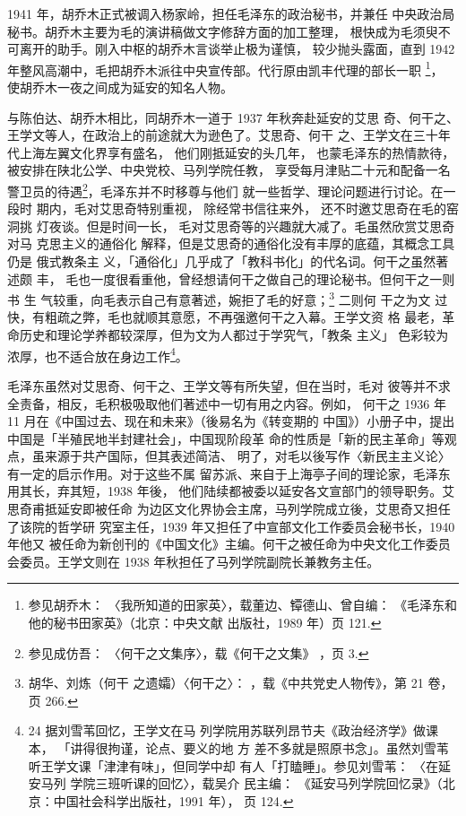 1941 年，胡乔木正式被调入杨家岭，担任毛泽东的政治秘书，并兼任 中央政治局
秘书。胡乔木主要为毛的演讲稿做文字修辞方面的加工整理， 根快成为毛须臾不
可离开的助手。刚入中枢的胡乔木言谈举止极为谨慎， 较少抛头露面，直到 1942
年整风高潮中，毛把胡乔木派往中央宣传部。代行原由凯丰代理的部长一职
\footnote{参见胡乔木： 〈我所知道的田家英〉，载董边、镡德山、曾自编：
《毛泽东和他的秘书田家英》（北京：中央文献 出版社，1989 年）页 121.}，
使胡乔木一夜之间成为延安的知名人物。

与陈伯达、胡乔木相比，同胡乔木一道于 1937 年秋奔赴延安的艾思 奇、何干之、
王学文等人，在政治上的前途就大为逊色了。艾思奇、何干 之、王学文在三十年
代上海左翼文化界享有盛名， 他们刚抵延安的头几年， 也蒙毛泽东的热情款待，
被安排在陕北公学、中央党校、马列学院任教， 享受每月津贴二十元和配备一名
警卫员的待遇\footnote{参见成仿吾： 〈何干之文集序〉，载《何干之文集》
，页 3.}，毛泽东并不时移尊与他们 就一些哲学、理论问题进行讨论。在一段时
期内，毛对艾思奇特别重视， 除经常书信往来外， 还不时邀艾思奇在毛的窑洞挑
灯夜谈。但是时间一长， 毛对艾思奇等的兴趣就大减了。毛虽然欣赏艾思奇对马
克思主义的通俗化 解释，但是艾思奇的通俗化没有丰厚的底蕴，其概念工具仍是
俄式教条主 义，「通俗化」几乎成了「教科书化」的代名词。何干之虽然著述颇
丰， 毛也一度很看重他，曾经想请何干之做自己的理论秘书。但何干之一则书 生
气较重，向毛表示自己有意著述，婉拒了毛的好意；\footnote{胡华、刘炼（何干
之遗孀）〈何干之〉： ，载《中共党史人物传》，第 21 卷，页 266.} 二则何
干之为文 过快，有粗疏之弊，毛也就顺其意愿，不再强邀何干之入幕。王学文资
格 最老，革命历史和理论学养都较深厚，但为文为人都过于学究气，「教条 主义」
色彩较为浓厚，也不适合放在身边工作\footnote{24 据刘雪苇回忆，王学文在马
列学院用苏联列昂节夫《政治经济学》做课本， 「讲得很拘谨，论点、要义的地
方 差不多就是照原书念」。虽然刘雪苇听王学文课「津津有味」，但同学中却
有人「打瞌睡」。参见刘雪苇： 〈在延安马列 学院三班听课的回忆〉，载吴介
民主编： 《延安马列学院回忆录》（北京：中国社会科学出版社，1991 年），
页 124.}。
 
毛泽东虽然对艾思奇、何干之、王学文等有所失望，但在当时，毛对
彼等并不求全责备，相反，毛积极吸取他们著述中一切有用之内容。例如，
何干之 1936 年 11 月在《中国过去、现在和未来》（後易名为《转变期的
中国》）小册子中，提出中国是「半殖民地半封建社会」，中国现阶段革
命的性质是「新的民主革命」等观点，虽来源于共产国际，但其表述简洁、
明了，对毛以後写作〈新民主主义论〉有一定的启示作用。对于这些不属
留苏派、来自于上海亭子间的理论家，毛泽东用其长，弃其短，1938 年後，
他们陆续都被委以延安各文宣部门的领导职务。艾思奇甫抵延安即被任命
为边区文化界协会主席，马列学院成立後，艾思奇又担任了该院的哲学研
究室主任，1939 年又担任了中宣部文化工作委员会秘书长，1940 年他又
被任命为新创刊的《中国文化》主编。何干之被任命为中央文化工作委员
会委员。王学文则在 1938 年秋担任了马列学院副院长兼教务主任。

